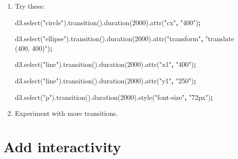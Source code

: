 \documentclass[openany]{book}
\newenvironment{Shaded}{\begin{snugshade}}{\end{snugshade}}
\newcommand{\AttributeTok}[1]{\textcolor[rgb]{0.77,0.63,0.00}{#1}}
\newcommand{\DecValTok}[1]{\textcolor[rgb]{0.00,0.00,0.81}{#1}}
\newcommand{\NormalTok}[1]{#1}
\newcommand{\OperatorTok}[1]{\textcolor[rgb]{0.81,0.36,0.00}{\textbf{#1}}}
\newcommand{\StringTok}[1]{\textcolor[rgb]{0.31,0.60,0.02}{#1}}
\newcommand{\VariableTok}[1]{\textcolor[rgb]{0.00,0.00,0.00}{#1}}
\begin{document}
\begin{enumerate}
\def\labelenumi{\arabic{enumi}.}
\item
  Try these:

\begin{Shaded}
\begin{Highlighting}[]
\VariableTok{d3}\NormalTok{.}\AttributeTok{select}\NormalTok{(}\StringTok{"circle"}\NormalTok{).}\AttributeTok{transition}\NormalTok{().}\AttributeTok{duration}\NormalTok{(}\DecValTok{2000}\NormalTok{).}\AttributeTok{attr}\NormalTok{(}\StringTok{"cx"}\OperatorTok{,} \StringTok{"400"}\NormalTok{)}\OperatorTok{;}

\VariableTok{d3}\NormalTok{.}\AttributeTok{select}\NormalTok{(}\StringTok{"ellipse"}\NormalTok{).}\AttributeTok{transition}\NormalTok{().}\AttributeTok{duration}\NormalTok{(}\DecValTok{2000}\NormalTok{).}\AttributeTok{attr}\NormalTok{(}\StringTok{"transform"}\OperatorTok{,} \StringTok{"translate (400, 400)"}\NormalTok{)}\OperatorTok{;}

\VariableTok{d3}\NormalTok{.}\AttributeTok{select}\NormalTok{(}\StringTok{"line"}\NormalTok{).}\AttributeTok{transition}\NormalTok{().}\AttributeTok{duration}\NormalTok{(}\DecValTok{2000}\NormalTok{).}\AttributeTok{attr}\NormalTok{(}\StringTok{"x1"}\OperatorTok{,} \StringTok{"400"}\NormalTok{)}\OperatorTok{;}

\VariableTok{d3}\NormalTok{.}\AttributeTok{select}\NormalTok{(}\StringTok{"line"}\NormalTok{).}\AttributeTok{transition}\NormalTok{().}\AttributeTok{duration}\NormalTok{(}\DecValTok{2000}\NormalTok{).}\AttributeTok{attr}\NormalTok{(}\StringTok{"y1"}\OperatorTok{,} \StringTok{"250"}\NormalTok{)}\OperatorTok{;}

\VariableTok{d3}\NormalTok{.}\AttributeTok{select}\NormalTok{(}\StringTok{"p"}\NormalTok{).}\AttributeTok{transition}\NormalTok{().}\AttributeTok{duration}\NormalTok{(}\DecValTok{2000}\NormalTok{).}\AttributeTok{style}\NormalTok{(}\StringTok{"font-size"}\OperatorTok{,} \StringTok{"72px"}\NormalTok{)}\OperatorTok{;}
\end{Highlighting}
\end{Shaded}
\item
  Experiment with more transitions.
\end{enumerate}

\hypertarget{add-interactivity}{%
\section{Add interactivity }\label{add-interactivity}}
\end{document}
